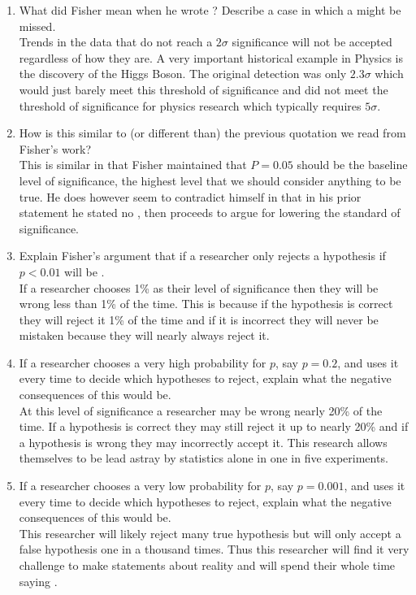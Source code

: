 \documentclass[a4paper, 12pt]{../../config/homework}
\begin{document}
\begin{enumerate}[label=\textbf{Task \arabic*}]
\pagebreak
\item What did Fisher mean when he wrote ? Describe a case in which a  might be missed.
\\ Trends in the data that do not reach a \(2\sigma \) significance will not be accepted regardless of how  they are. A very important historical example in Physics is the discovery of the Higgs Boson. The original detection was only \(2.3\sigma \) which would just barely meet this threshold of significance and did not meet the threshold of significance for physics research which typically requires \(5\sigma \).

\item How is this similar to (or different than) the previous quotation we read from Fisher's work?
\\ This is similar in that Fisher maintained that \(P=0.05\) should be the baseline level of significance, the highest level that we should consider anything to be true. He does however seem to contradict himself in that in his prior statement he stated no , then proceeds to argue for lowering the standard of significance.

\item Explain Fisher's argument that if a researcher only rejects a hypothesis if \(p < 0.01\) will be .
\\ If a researcher chooses 1\% as their level of significance then they will be wrong less than 1\% of the time. This is because if the hypothesis is correct they will reject it 1\% of the time and if it is incorrect they will never be mistaken because they will nearly always reject it.

\item If a researcher chooses a very high probability for \(p\), say \(p=0.2\), and uses it every time to decide which hypotheses to reject, explain what the negative consequences of this would be.
\\ At this level of significance a researcher may be wrong nearly 20\% of the time. If a hypothesis is correct they may still reject it up to nearly 20\% and if a hypothesis is wrong they may incorrectly accept it. This research allows themselves to be lead astray by statistics alone in one in five experiments.

\pagebreak
\item If a researcher chooses a very low probability for \(p\), say \(p=0.001\), and uses it every time to decide which hypotheses to reject, explain what the negative consequences of this would be.
\\ This researcher will likely reject many true hypothesis but will only accept a false hypothesis one in a thousand times. Thus this researcher will find it very challenge to make statements about reality and will spend their whole time saying .


\end{enumerate}
\end{document}
